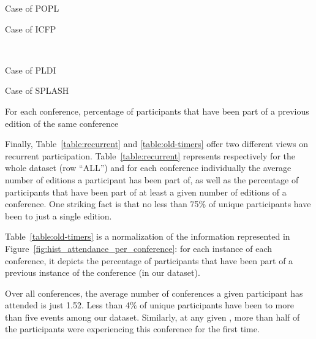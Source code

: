 \begin{table}
  \centering
  \begin{subtable}[b]{0.4\textwidth}
    \centering
    \caption{Case of POPL}
  \end{subtable}
  \begin{subtable}[b]{0.4\textwidth}
    \centering
    \caption{Case of ICFP}
  \end{subtable}
  \\
  \begin{subtable}[b]{0.4\textwidth}
    \centering
    \caption{Case of PLDI}
  \end{subtable}
  \begin{subtable}[b]{0.4\textwidth}
    \centering
    \caption{Case of SPLASH}
  \end{subtable}
  \caption{For each conference, percentage of participants that have been
    part of a previous edition of the same conference}
  \label{table:old-timers}
\end{table}

Finally, Table~\ref{table:recurrent} and \ref{table:old-timers} offer two
different views on recurrent participation. Table~\ref{table:recurrent}
represents respectively for the whole dataset (row ``ALL'') and for each
conference individually the average number of editions a participant has
been part of, as well as the percentage of participants that have been part
of at least a given number of editions of a conference. One striking fact is
that no less than 75\% of unique participants have been to just a single
edition.

Table~\ref{table:old-timers} is a normalization of the information represented
in Figure~\ref{fig:hist_attendance_per_conference}: for each instance of each
conference, it depicts the percentage of participants that have been part of a
previous instance of the conference (in our dataset).

\begin{obs}
Over all conferences, the average number of conferences a given participant
has attended is just 1.52. Less than 4\% of unique participants have been to
more than five events among our dataset.  Similarly, at any given \event,
more than half of the participants were experiencing this conference for the
first time.
\label{obs:old-timers}
\end{obs}


